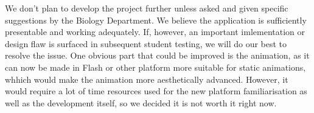 We don't plan to develop the project further unless asked and given specific suggestions by the Biology Department. We believe the application is sufficiently presentable and working adequately. If, however, an important imlementation or design flaw is surfaced in subsequent student testing, we will do our best to resolve the issue. One obvious part that could be improved is the animation, as it can now be made in Flash or other platform more suitable for static animations, whhich would make the animation more aesthetically advanced. However, it would require a lot of time resources used for the new platform familiarisation as well as the development itself, so we decided it is not worth it right now. 